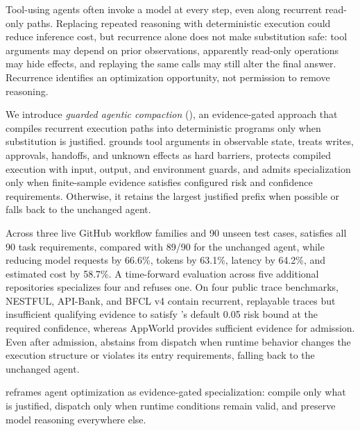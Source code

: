 Tool-using agents often invoke a model at every step, even along recurrent read-only
paths. Replacing repeated reasoning with deterministic execution could reduce inference
cost, but recurrence alone does not make substitution safe: tool arguments may depend on
prior observations, apparently read-only operations may hide effects, and replaying the
same calls may still alter the final answer. Recurrence identifies an optimization
opportunity, not permission to remove reasoning.

We introduce \emph{guarded agentic compaction} (\method), an evidence-gated approach that
compiles recurrent execution paths into deterministic programs only when substitution is
justified. \method grounds tool arguments in observable state, treats writes, approvals,
handoffs, and unknown effects as hard barriers, protects compiled execution with input,
output, and environment guards, and admits specialization only when finite-sample evidence
satisfies configured risk and confidence requirements. Otherwise, it retains the largest
justified prefix when possible or falls back to the unchanged agent.

Across three live GitHub workflow families and 90 unseen test cases, \method satisfies all
90 task requirements, compared with 89/90 for the unchanged agent, while reducing model
requests by 66.6\%, tokens by 63.1\%, latency by 64.2\%, and estimated cost by 58.7\%. A
time-forward evaluation across five additional repositories specializes four and refuses
one. On four public trace benchmarks, NESTFUL, API-Bank, and BFCL v4 contain recurrent,
replayable traces but insufficient qualifying evidence to satisfy \method's default 0.05
risk bound at the required confidence, whereas AppWorld provides sufficient evidence for
admission. Even after admission, \method abstains from dispatch when runtime behavior
changes the execution structure or violates its entry requirements, falling back to the
unchanged agent.

\method reframes agent optimization as evidence-gated specialization: compile only what is
justified, dispatch only when runtime conditions remain valid, and preserve model
reasoning everywhere else.
